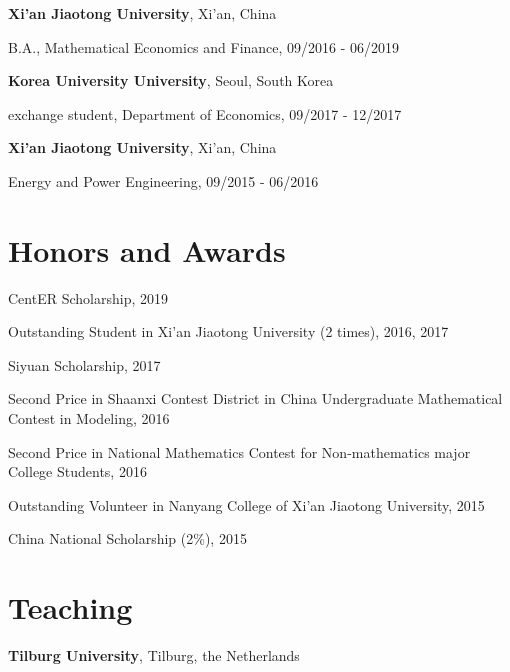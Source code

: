 \documentclass[margin,line]{res}
\newenvironment{list1}{
  \begin{list}{\ding{113}}{%
      \setlength{\itemsep}{0in}
      \setlength{\parsep}{0in} \setlength{\parskip}{0in}
      \setlength{\topsep}{0in} \setlength{\partopsep}{0in} 
      \setlength{\leftmargin}{0.17in}}}{\end{list}}
\begin{document}
\begin{resume}
{\bf Xi'an Jiaotong University}, Xi'an, China\\
\vspace*{-.1in}
\begin{list1}
\item[] B.A., Mathematical Economics and Finance, 09/2016 - 06/2019
\end{list1}

{\bf Korea University University}, Seoul, South Korea\\
\vspace*{-.1in}
\begin{list1}
\item[] exchange student, Department of Economics, 09/2017 - 12/2017
\end{list1}

{\bf Xi'an Jiaotong University}, Xi'an, China\\
\vspace*{-.1in}
\begin{list1}
\item[] Energy and Power Engineering, 09/2015 - 06/2016
\end{list1}

\section{\sc Honors and Awards} 
CentER Scholarship, 2019
\vspace*{-2.5mm}

Outstanding Student in Xi'an Jiaotong University (2 times), 2016, 2017
\vspace*{-2.5mm}

Siyuan Scholarship, 2017
\vspace*{-2.5mm}

Second Price in Shaanxi Contest District in China Undergraduate Mathematical Contest in Modeling, 2016
\vspace*{-2.5mm}

Second Price in National Mathematics Contest for Non-mathematics major College Students, 2016
\vspace*{-2.5mm}

Outstanding Volunteer in Nanyang College of Xi'an Jiaotong University, 2015
\vspace*{-2.5mm}

China National Scholarship (2\%), 2015

\section{\sc Teaching}
{\bf Tilburg University}, Tilburg, the Netherlands


\end{resume}
\end{document}
